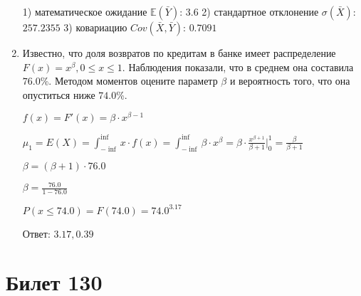 \documentclass[a4paper,12pt]{article}
\begin{document}
\begin{enumerate}
1) математическое ожидание $\mathbb{E}(\bar Y)$: $3.6$ 
2) стандартное отклонение $\sigma(\bar X)$: $257.2355$
3) ковариацию $Cov(\bar X, \bar Y)$: $0.7091$


\item

    
	Известно, что доля возвратов по кредитам в банке имеет распределение $F(x) = x^{\beta}, 0 \le x \le 1$. Наблюдения показали, что в среднем она составила $76.0$\%. Методом моментов оцените параметр $\beta$ и вероятность того, что она опуститься ниже $74.0$\%.
	


	

	$f(x) = F'(x) = \beta \cdot x^{\beta - 1}$

	$\mu_{1} = E(X) = \int_{-\inf}^{\inf}x \cdot f(x) = \int_{-\inf}^{\inf} \beta \cdot x^{\beta} = \beta \cdot \frac{x^{\beta + 1}}{\beta + 1}\bigg|_0^1 = \frac{\beta}{\beta + 1}$

	$\beta = (\beta + 1) \cdot 76.0$

	$\beta = \frac{76.0}{1 - 76.0}$

	$ P(x \le 74.0) = F(74.0) = 74.0^{3.17} $

    Ответ: $3.17, 0.39$
	


\end{enumerate}

\section{Билет 130}
\end{document}
